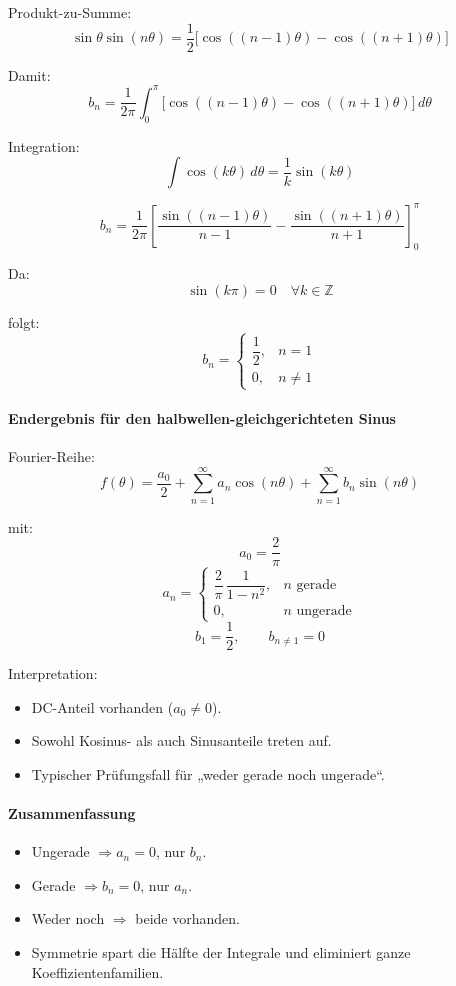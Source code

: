Produkt-zu-Summe:
\[
\sin\theta\sin(n\theta)=\frac{1}{2}
\Big[\cos((n-1)\theta)-\cos((n+1)\theta)\Big]
\]

Damit:
\[
b_n=\frac{1}{2\pi}\int_0^{\pi}
\Big[\cos((n-1)\theta)-\cos((n+1)\theta)\Big]\,d\theta
\]

Integration:
\[
\int \cos(k\theta)\,d\theta=\frac{1}{k}\sin(k\theta)
\]

\[
b_n=\frac{1}{2\pi}
\left[
\frac{\sin((n-1)\theta)}{n-1}
-\frac{\sin((n+1)\theta)}{n+1}
\right]_0^{\pi}
\]

Da:
\[
\sin(k\pi)=0 \quad \forall k\in\mathbb{Z}
\]

folgt:
\[
\boxed{
b_n=
\begin{cases}
\dfrac{1}{2}, & n=1 \\[6pt]
0, & n\neq 1
\end{cases}
}
\]

\paragraph{Endergebnis für den halbwellen-gleichgerichteten Sinus}

Fourier-Reihe:
\[
f(\theta)=\frac{a_0}{2}
+\sum_{n=1}^\infty a_n\cos(n\theta)
+\sum_{n=1}^\infty b_n\sin(n\theta)
\]

mit:
\[
\boxed{a_0=\frac{2}{\pi}}
\]
\[
\boxed{
a_n=
\begin{cases}
\dfrac{2}{\pi}\,\dfrac{1}{1-n^2}, & n \text{ gerade}\\[6pt]
0, & n \text{ ungerade}
\end{cases}
}
\]
\[
\boxed{
b_1=\frac{1}{2},\qquad
b_{n\neq 1}=0
}
\]

Interpretation:
\begin{itemize}
    \item DC-Anteil vorhanden ($a_0\neq 0$).
    \item Sowohl Kosinus- als auch Sinusanteile treten auf.
    \item Typischer Prüfungsfall für „weder gerade noch ungerade“.
\end{itemize}


\paragraph{Zusammenfassung}

\begin{itemize}
    \item Ungerade $\Rightarrow a_n=0$, nur $b_n$.
    \item Gerade $\Rightarrow b_n=0$, nur $a_n$.
    \item Weder noch $\Rightarrow$ beide vorhanden.
    \item Symmetrie spart die Hälfte der Integrale und eliminiert ganze Koeffizientenfamilien.
\end{itemize}

